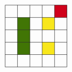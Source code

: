 \documentclass[12pt]{article}
\begin{document}
\begin{itemize}[align=left]
\[\begin{tikzpicture}[x=0.75pt,y=0.75pt,yscale=-1,xscale=1]
        \draw  [draw opacity=0][fill={rgb, 255:red, 208; green, 2; blue, 27 }  ,fill opacity=1 ] (280,110) -- (280,130) -- (260,130) -- (260,110) -- cycle ;
        \draw  [draw opacity=0][fill={rgb, 255:red, 248; green, 231; blue, 28 }  ,fill opacity=1 ] (260,130) -- (260,150) -- (240,150) -- (240,130) -- cycle ;
        \draw  [draw opacity=0][fill={rgb, 255:red, 248; green, 231; blue, 28 }  ,fill opacity=1 ] (260,170) -- (260,190) -- (240,190) -- (240,170) -- cycle ;
        \draw  [draw opacity=0][fill={rgb, 255:red, 65; green, 117; blue, 5 }  ,fill opacity=1 ] (220,130) -- (220,150) -- (200,150) -- (200,130) -- cycle ;
        \draw  [draw opacity=0][fill={rgb, 255:red, 65; green, 117; blue, 5 }  ,fill opacity=1 ] (220,150) -- (220,170) -- (200,170) -- (200,150) -- cycle ;
        \draw  [draw opacity=0][fill={rgb, 255:red, 65; green, 117; blue, 5 }  ,fill opacity=1 ] (220,170) -- (220,190) -- (200,190) -- (200,170) -- cycle ;
        \draw  [draw opacity=0] (280,110) -- (280,210) -- (180,210) -- (180,110) -- cycle ; \draw   (280,130) -- (180,130)(280,150) -- (180,150)(280,170) -- (180,170)(280,190) -- (180,190) ; \draw   (260,110) -- (260,210)(240,110) -- (240,210)(220,110) -- (220,210)(200,110) -- (200,210) ; \draw   (280,110) -- (280,210) -- (180,210) -- (180,110) -- cycle ;
        

\end{tikzpicture}\]
\end{itemize}
\end{document}
